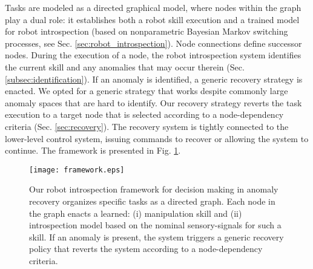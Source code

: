 \documentclass[letterpaper, 10 pt, conference]{ieeeconf}  %
\begin{document}
Tasks are modeled as a directed graphical model, where nodes within the graph play a dual role: it establishes both a robot skill execution and a trained model for robot introspection (based on nonparametric Bayesian Markov switching processes, see Sec. \ref{sec:robot_introspection}). Node connections define successor nodes. During the execution of a node, the robot introspection system identifies the current skill and any anomalies that may occur therein (Sec. \ref{subsec:identification}). If an anomaly is identified, a generic recovery strategy is enacted. We opted for a generic strategy that works despite commonly large anomaly spaces that are hard to identify. Our recovery strategy reverts the task execution to a target node that is selected according to a node-dependency criteria (Sec. \ref{sec:recovery}). The recovery system is tightly connected to the lower-level control system, issuing commands to recover or allowing the system to continue. The framework is presented in Fig. \ref{fig:framework}.
\begin{figure}     
	\centering		
		\texttt{[image: framework.eps]}
		\caption{Our robot introspection framework for decision making in anomaly recovery organizes specific tasks as a directed graph. Each node in the graph enacts a learned: (i) manipulation skill and (ii) introspection model based on the nominal sensory-signals for such a skill. If an anomaly is present, the system triggers a generic recovery policy that reverts the system according to a node-dependency criteria.}
        \label{fig:framework}        
\end{figure}
\end{document}
